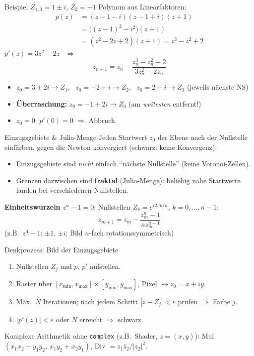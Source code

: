 \documentclass[a4paper, fontsize=7pt]{scrartcl}
\begin{document}
\begin{subbox}{Beispiel $Z_{1,3} = 1 \pm i$, $Z_2 = -1$}
Polynom aus Linearfaktoren:
\begin{align*}
p(z) &= (z - 1 - i)(z - 1 + i)(z + 1)\\
&= \big((z-1)^2 - i^2\big)(z + 1)\\
&= (z^2 - 2z + 2)(z + 1) = z^3 - z^2 + 2
\end{align*}
$p'(z) = 3z^2 - 2z$ \ $\Rightarrow$
$$z_{n+1} = z_n - \frac{z_n^3 - z_n^2 + 2}{3z_n^2 - 2z_n}$$
\begin{itemize}
    \item $z_0 = 3 + 2i \to Z_1$, \ $z_0 = -2 + i \to Z_2$,
          \ $z_0 = 2 - i \to Z_3$ (jeweils nächste NS)
    \item \textbf{Überraschung:} $z_0 = -1 + 2i \to Z_3$ (am
          \emph{weitesten} entfernt!)
    \item $z_0 = 0$: $p'(0) = 0$ $\Rightarrow$ Abbruch
\end{itemize}
\end{subbox}

\begin{mainbox}{Einzugsgebiete \& Julia-Menge}
Jeden Startwert $z_0$ der Ebene nach der Nullstelle einfärben, gegen
die Newton konvergiert (schwarz: keine Konvergenz).
\begin{itemize}
    \item Einzugsgebiete sind \emph{nicht} einfach ``nächste Nullstelle''
          (keine Voronoi-Zellen).
    \item Grenzen dazwischen sind \textbf{fraktal} (Julia-Menge):
          beliebig nahe Startwerte landen bei verschiedenen Nullstellen.
\end{itemize}
\textbf{Einheitswurzeln} $z^n - 1 = 0$: Nullstellen
$Z_k = e^{i 2\pi k/n}$, $k = 0, \ldots, n{-}1$:
$$z_{m+1} = z_m - \frac{z_m^n - 1}{n z_m^{n-1}}$$
(z.B.\ $z^4 - 1$: $\pm 1$, $\pm i$; Bild $n$-fach rotationssymmetrisch)
\end{mainbox}

\begin{subbox}{Denkprozess: Bild der Einzugsgebiete}
\begin{enumerate}
    \item Nullstellen $Z_j$ und $p$, $p'$ aufstellen.
    \item Raster über $[x_{\min}, x_{\max}] \times [y_{\min}, y_{\max}]$,
          Pixel $\to z_0 = x + iy$.
    \item Max.\ $N$ Iterationen; nach jedem Schritt
          $|z - Z_j| < \varepsilon$ prüfen $\Rightarrow$ Farbe $j$.
    \item $|p'(z)| < \varepsilon$ oder $N$ erreicht $\Rightarrow$ schwarz.
\end{enumerate}
Komplexe Arithmetik ohne \texttt{complex} (z.B.\ Shader, $z = (x, y)$):
Mul $(x_1x_2 - y_1y_2,\ x_1y_2 + x_2y_1)$,
Div $= z_1\bar{z}_2 / |z_2|^2$.
\end{subbox}
\end{document}
